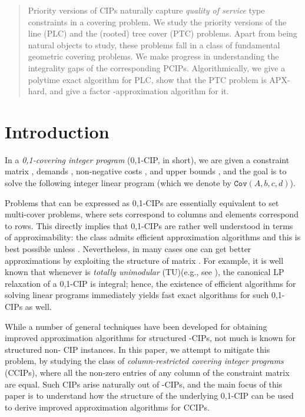 \documentclass[11pt]{article}
\newcommand{\cov}[1]{\ensuremath{\mathtt{Cov}(#1)}}
\newcommand{\1}{\mathbb{1}}
\begin{document}
\begin{abstract}
\hspace{5mm} Priority versions of CIPs naturally capture {\em quality of service}
type constraints in a covering problem. We study the priority versions
of the line (PLC) and the (rooted) tree cover (PTC) problems. Apart
from being natural objects to study, these problems fall in a class
of fundamental geometric covering problems. We make progress in
understanding the integrality gaps of the corresponding
PCIPs. Algorithmically, we give a polytime exact algorithm for PLC,
show that the PTC problem is APX-hard, and give a factor
-approximation algorithm for it.
\fi
\end{abstract}




\section{Introduction}
In a {\em 0,1-covering integer program} (0,1-CIP, in short), we are
given a constraint matrix , demands , non-negative costs , and upper bounds , and the goal is to solve the following integer linear
program (which we denote by \cov{A,b,c,d}).



Problems that can be expressed as 0,1-CIPs are essentially equivalent
to set multi-cover problems, where sets correspond to columns and
elements correspond to rows.  This directly implies that 0,1-CIPs are
rather well understood in terms of approximability: the class admits
efficient  approximation algorithms and this is best
possible unless .  Nevertheless, in many cases one can get
better approximations by exploiting the structure of matrix .  For
example, it is well known that whenever  is {\em totally
  unimodular} (TU)(e.g., see \cite{Sc03}), the canonical LP relaxation
of a 0,1-CIP is integral; hence, the existence of efficient algorithms
for solving linear programs immediately yields fast exact algorithms
for such 0,1-CIPs as well.

While a number of general techniques have been developed for obtaining
improved approximation algorithms for structured -CIPs, not much is known
for structured non- CIP instances. In this paper, we attempt to
mitigate this problem, by studying the class of {\em column-restricted
  covering integer programs} (CCIPs), where all the non-zero entries 
  of any column of the constraint matrix are equal. Such CIPs arise
  naturally out of -CIPs, and the main focus of this paper 
  is to understand how the structure of the underlying 0,1-CIP can be used 
  to derive improved approximation algorithms for CCIPs.
  \\
\end{document}
